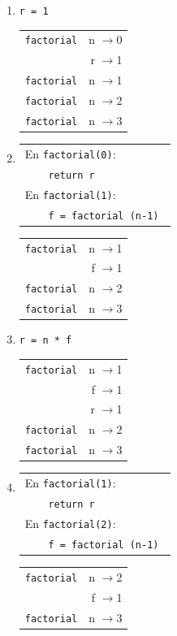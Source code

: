 \begin{enumerate}
\item  \verb|r = 1                     |
	\begin{tabular}{r|r|}
	\hline
	\verb|factorial|&n $\rightarrow$0\\
	          &r $\rightarrow$1\\
	\hline
	\hline
	\verb|factorial|&n $\rightarrow$1\\
	\hline
	\hline
	\verb|factorial|&n $\rightarrow$2\\
	\hline
	\hline
	\verb|factorial|&n $\rightarrow$3\\
	\hline
	\end{tabular}

\item
\begin{tabular}{l}
En \lstinline!factorial(0)!: \\ \verb|    return r| \\
En \lstinline!factorial(1)!: \\ \verb|    f = factorial (n-1) |
\end{tabular}
	\begin{tabular}{r|r|}
	\hline
	\verb|factorial|&n $\rightarrow$1\\
	&f $\rightarrow$1\\
	\hline
	\hline
	\verb|factorial|&n $\rightarrow$2\\
	\hline
	\hline
	\verb|factorial|&n $\rightarrow$3\\
	\hline
	\end{tabular}

\item  \verb|r = n * f                 |
\begin{tabular}{r|r|}
\hline
\verb|factorial|&n $\rightarrow$1\\
  &f $\rightarrow$1\\
  &r $\rightarrow$1\\
\hline
\hline
\verb|factorial|&n $\rightarrow$2\\
\hline
\hline
\verb|factorial|&n $\rightarrow$3\\
\hline
\end{tabular}

\item
\begin{tabular}{l}
En \lstinline!factorial(1)!: \\ \verb|    return r| \\
En \lstinline!factorial(2)!: \\ \verb|    f = factorial (n-1) |
\end{tabular}
	\begin{tabular}{r|r|}
	\hline
	\verb|factorial|&n $\rightarrow$2\\
	&f $\rightarrow$1\\
	\hline
	\hline
	\verb|factorial|&n $\rightarrow$3\\
	\hline
	\end{tabular}


\end{enumerate}
